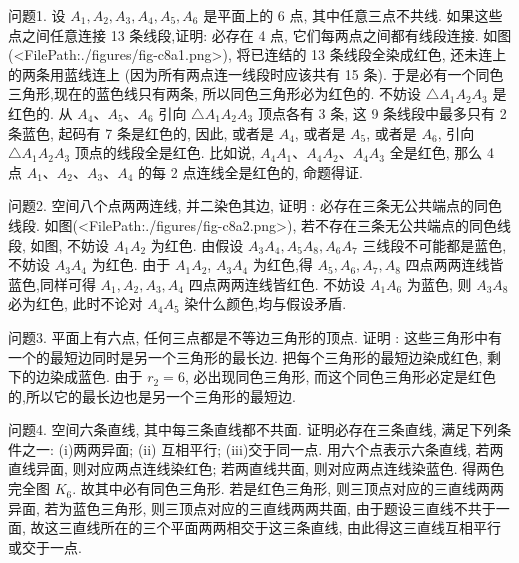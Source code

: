 
问题1. 设 $A_1, A_2, A_3, A_4, A_5, A_6$ 是平面上的 6 点, 其中任意三点不共线.
如果这些点之间任意连接 13 条线段,证明: 必存在 4 点, 它们每两点之间都有线段连接.
如图(<FilePath:./figures/fig-c8a1.png>), 将已连结的 13 条线段全染成红色, 还未连上的两条用蓝线连上 (因为所有两点连一线段时应该共有 15 条). 于是必有一个同色三角形,现在的蓝色线只有两条, 所以同色三角形必为红色的.
不妨设 $\triangle A_1 A_2 A_3$ 是红色的.
从 $A_4 、 A_5 、 A_6$ 引向 $\triangle A_1 A_2 A_3$ 顶点各有 3 条, 这 9 条线段中最多只有 2 条蓝色, 起码有 7 条是红色的, 因此, 或者是 $A_4$, 或者是 $A_5$, 或者是 $A_6$, 引向
$\triangle A_1 A_2 A_3$ 顶点的线段全是红色.
比如说, $A_4 A_1 、 A_4 A_2 、 A_4 A_3$ 全是红色, 那么 4 点 $A_1 、 A_2 、 A_3 、 A_4$ 的每 2 点连线全是红色的, 命题得证.



问题2. 空间八个点两两连线, 并二染色其边, 证明 : 必存在三条无公共端点的同色线段.
如图(<FilePath:./figures/fig-c8a2.png>), 若不存在三条无公共端点的同色线段, 如图, 不妨设 $A_1 A_2$ 为红色.
由假设 $A_3 A_4, A_5 A_8, A_6 A_7$ 三线段不可能都是蓝色, 不妨设 $A_3 A_4$ 为红色.
由于 $A_1 A_2$, $A_3 A_4$ 为红色,得 $A_5, A_6, A_7, A_8$ 四点两两连线皆蓝色,同样可得 $A_1, A_2, A_3, A_4$ 四点两两连线皆红色.
不妨设 $A_1 A_6$ 为蓝色, 则 $A_3 A_8$ 必为红色, 此时不论对 $A_4 A_5$ 染什么颜色,均与假设矛盾.



问题3. 平面上有六点, 任何三点都是不等边三角形的顶点.
证明 : 这些三角形中有一个的最短边同时是另一个三角形的最长边.
把每个三角形的最短边染成红色, 剩下的边染成蓝色.
由于 $r_2=6$, 必出现同色三角形, 而这个同色三角形必定是红色的,所以它的最长边也是另一个三角形的最短边.



问题4. 空间六条直线, 其中每三条直线都不共面.
证明必存在三条直线, 满足下列条件之一: (i)两两异面; (ii) 互相平行; (iii)交于同一点.
用六个点表示六条直线, 若两直线异面, 则对应两点连线染红色; 若两直线共面, 则对应两点连线染蓝色.
得两色完全图 $K_6$. 故其中必有同色三角形.
若是红色三角形, 则三顶点对应的三直线两两异面, 若为蓝色三角形, 则三顶点对应的三直线两两共面, 由于题设三直线不共于一面, 故这三直线所在的三个平面两两相交于这三条直线, 由此得这三直线互相平行或交于一点.



